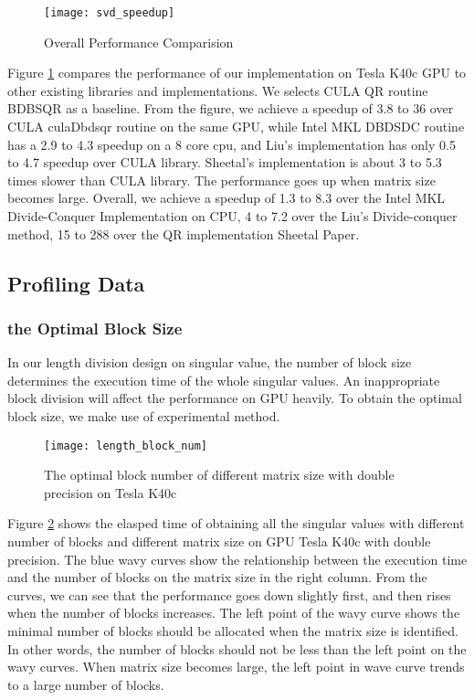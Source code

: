 \begin{figure}[hbpt]
\centering
\texttt{[image: svd\_speedup]}
\caption{Overall Performance Comparision}
\label{fig:svd_speedup}
\end{figure}
Figure \ref{fig:svd_speedup} compares the performance of our implementation on Tesla K40c GPU to other existing libraries and implementations.
We selects CULA QR routine BDBSQR as a baseline.
From the figure, we achieve a speedup of 3.8 to 36 over CULA culaDbdsqr routine on the same GPU,
while Intel MKL DBDSDC routine has a 2.9 to 4.3 speedup on a 8 core cpu, and Liu's implementation has only 0.5 to 4.7 speedup over CULA library.
Sheetal's implementation is about 3 to 5.3 times slower than CULA library.
The performance goes up when matrix size becomes large.
Overall, we achieve a speedup of 1.3 to 8.3 over the Intel MKL Divide-Conquer Implementation on CPU, 4 to 7.2 over the Liu's Divide-conquer method, 15 to 288 over the QR implementation Sheetal Paper.

\subsection{Profiling Data}

\subsubsection{the Optimal Block Size}
In our length division design on singular value, the number of block size determines the execution time of the whole singular values.
An inappropriate block division will affect the performance on GPU heavily.
To obtain the optimal block size, we make use of experimental method. 

\begin{figure}[hbpt]
\centering
\texttt{[image: length\_block\_num]}
\caption{The optimal block number of different matrix size with double precision on Tesla K40c}
\label{fig:length_block_num}
\end{figure}
Figure \ref{fig:length_block_num} shows the elasped time of obtaining all the singular values with different number of blocks and different matrix size on GPU Tesla K40c with double precision.
The blue wavy curves show the relationship between the execution time and the number of blocks on the matrix size in the right column.
From the curves, we can see that the performance goes down slightly first, and then rises when the number of blocks increases.
The left point of the wavy curve shows the minimal number of blocks should be allocated when the matrix size is identified.
In other words, the number of blocks should not be less than the left point on the wavy curves.
When matrix size becomes large, the left point in wave curve trends to a large number of blocks.

